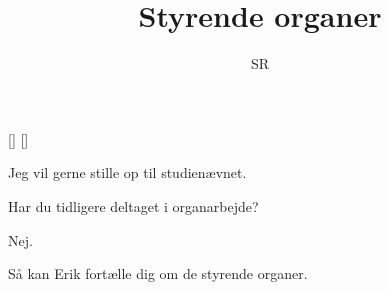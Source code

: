 \documentclass[a4paper,11pt]{article}
\title{Styrende organer}
\author{SR}
\begin{document}
\maketitle

\begin{roles}
[]
[]
\end{roles}

\begin{sketch}

 Jeg vil gerne stille op til studienævnet.

 Har du tidligere deltaget i organarbejde?

 Nej.

 Så kan Erik fortælle dig om de styrende organer.

\end{sketch}
\end{document}
